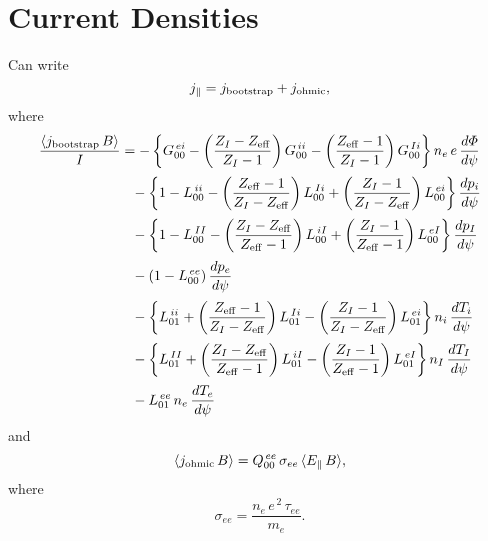 \documentclass[12pt]{article}
\begin{document}
\section{Current Densities}
Can write
\begin{equation}
j_\parallel = j_{\rm bootstrap} + j_{\rm ohmic},
\end{equation}
where
\begin{align}
\frac{\langle j_{\rm bootstrap}\,B\rangle}{I}&=-\left\{G_{00}^{\,ei}-\left(\frac{Z_I-Z_{\rm eff}}{Z_I-1}\right)G^{\,ii}_{00}- \left(\frac{Z_{\rm eff}-1}{Z_I-1}\right)G_{00}^{\,Ii}\right\}n_e\,e\,\frac{d{\mit\Phi}}{d\psi}\nonumber\\[0.5ex]
&\phantom{=} -\left\{1-L^{\,ii}_{00} - \left(\frac{Z_{\rm eff}-1}{Z_I-Z_{\rm eff}}\right)L^{\,Ii}_{00}
+ \left(\frac{Z_I-1}{Z_I-Z_{\rm eff}}\right)L^{\,ei}_{00}\right\}\frac{dp_i}{d\psi}\nonumber\\[0.5ex]
&\phantom{=}
- \left\{1-L^{\,II}_{00} - \left(\frac{Z_I-Z_{\rm eff}}{Z_{\rm eff}-1}\right)L^{\,iI}_{00}
+ \left(\frac{Z_I-1}{Z_{\rm eff}-1}\right)L^{\,eI}_{00}\right\}\frac{dp_I}{d\psi}
\nonumber\\[0.5ex]
&\phantom{=}-(1-L^{\,ee}_{00})\,\frac{dp_e}{d\psi}\nonumber\\[0.5ex]
&\phantom{=}- \left\{L^{\,ii}_{01} + \left(\frac{Z_{\rm eff}-1}{Z_I-Z_{\rm eff}}\right)L^{\,Ii}_{01}
- \left(\frac{Z_I-1}{Z_I-Z_{\rm eff}}\right)L^{\,ei}_{01}\right\}n_i\,\frac{dT_i}{d\psi}\nonumber\\[0.5ex]
&\phantom{=}
- \left\{L^{\,II}_{01} + \left(\frac{Z_I-Z_{\rm eff}}{Z_{\rm eff}-1}\right)L^{\,iI}_{01}
- \left(\frac{Z_I-1}{Z_{\rm eff}-1}\right)L^{\,eI}_{01}\right\}n_I\,\frac{dT_I}{d\psi}
\nonumber\\[0.5ex]
&\phantom{=}-L^{\,ee}_{01}\,n_e\,\frac{dT_e}{d\psi}
\end{align}
and
\begin{equation}
\langle j_{\rm ohmic}\,B\rangle = Q^{\,ee}_{00}\,\sigma_{ee}\,\langle E_\parallel\,B\rangle,
\end{equation}
where 
\begin{equation}
\sigma_{ee} = \frac{n_e\,e^{\,2}\,\tau_{ee}}{m_e}.
\end{equation}
\end{document}
